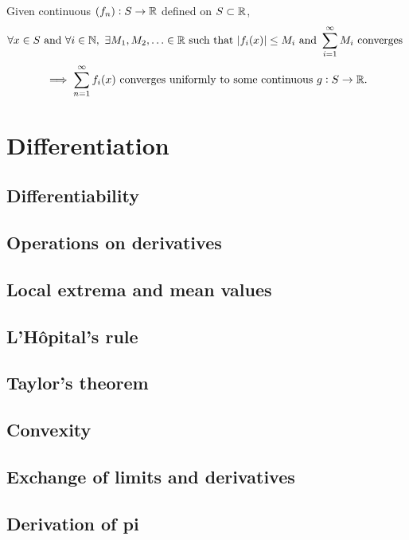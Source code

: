 \begingroup\belowdisplayskip=-8pt
\begin{theorem}
    Given continuous $(f_n):S\rightarrow\mathbb{R}$ defined on $S\subset\mathbb{R}$, \[
    \forall x\in S \ \text{\textcolor{black}{and }} \forall i\in\NN, \ \exists M_1,M_2,\ldots \in\RR \
\text{\textcolor{black}{ such that }} |f_i(x)|\leq M_i \ \text{\textcolor{black}{and }} \displaystyle\sum_{i=1}^\infty M_i \ \text{\textcolor{black}{ converges }}\]\[ \implies \displaystyle\sum_{n=1}^\infty f_i(x) \ \text{\textcolor{black}{converges uniformly to some continuous }} g:S\rightarrow\RR
\textcolor{black}{.}
\]
\end{theorem}
\endgroup

\section{Differentiation}

\subsection{Differentiability}

\subsection{Operations on derivatives}

\subsection{Local extrema and mean values}

\subsection{L'Hôpital's rule}

\subsection{Taylor's theorem}

\subsection{Convexity}

\subsection{Exchange of limits and derivatives}

\subsection{Derivation of pi}

